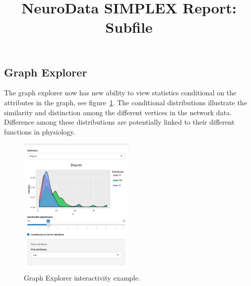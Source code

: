 \documentclass[simplex.tex]{subfiles}
\title{NeuroData SIMPLEX Report: Subfile}
\begin{document}

\subsection{Graph Explorer}

The graph explorer now has new ability to view statistics conditional on
the attributes in the graph, see figure~\ref{fig:graphExplorer}. The conditional distributions illustrate
the similarity and distinction among the different vertices in the
network data. Difference among these distributions are potentially
linked to their different functions in physiology.


\begin{figure}[h!]
\begin{cframed}
\centering
\includegraphics[width=0.5\textwidth]{./figs/graph-explorer.png}
\caption{Graph Explorer interactivity example.}
\label{fig:graphExplorer}
\end{cframed}
\end{figure}
\end{document}
